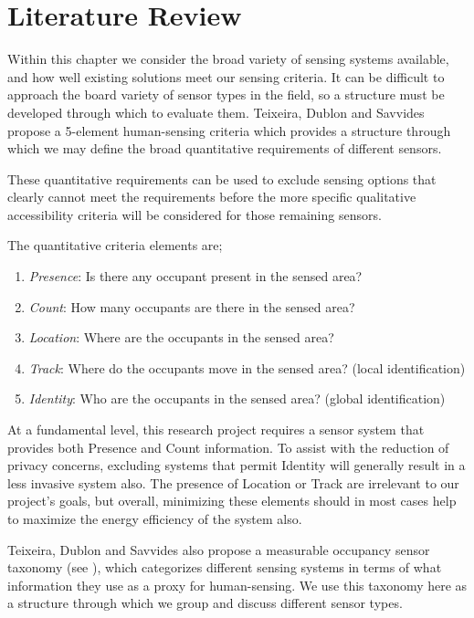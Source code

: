 \documentclass[../thesis/thesis.tex]{subfiles}
\begin{document}
\chapter{Literature Review}
\label{chap:litreview}

Within this chapter we consider the broad variety of sensing systems available, and how well existing solutions meet our sensing criteria. It can be difficult to approach the board variety of sensor types in the field, so a structure must be developed through which to evaluate them. Teixeira, Dublon and Savvides \cite{teixeira2010survey} propose a 5-element human-sensing criteria which provides a structure through which we may define the broad quantitative requirements of different sensors.

These quantitative requirements can be used to exclude sensing options that clearly cannot meet the requirements before the more specific qualitative accessibility criteria will be considered for those remaining sensors. 

The quantitative criteria elements are;
\begin{enumerate}
 \item \emph{Presence}: Is there any occupant present in the sensed area?
 \item \emph{Count}: How many occupants are there in the sensed area?
 \item \emph{Location}: Where are the occupants in the sensed area?
 \item \emph{Track}: Where do the occupants move in the sensed area? (local identification)
 \item \emph{Identity}: Who are the occupants in the sensed area? (global identification)
\end{enumerate}

At a fundamental level, this research project requires a sensor system that provides both Presence and Count information. To assist with the reduction of privacy concerns, excluding systems that permit Identity will generally result in a less invasive system also. The presence of Location or Track are irrelevant to our project's goals, but overall, minimizing these elements should in most cases help to maximize the energy efficiency of the system also.

Teixeira, Dublon and Savvides \cite{teixeira2010survey} also propose a measurable occupancy sensor taxonomy (see ), which categorizes different sensing systems in terms of what information they use as a proxy for human-sensing. We use this taxonomy here as a structure through which we group and discuss different sensor types.
\end{document}
